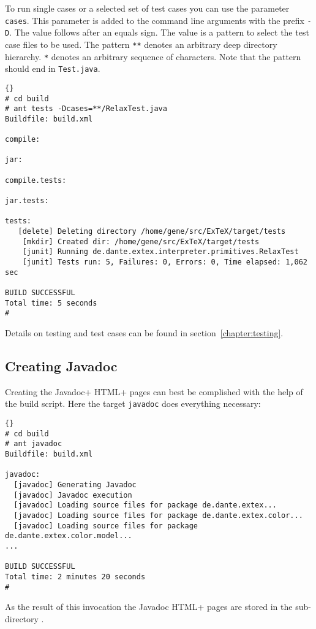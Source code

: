 To run single cases or a selected set of test cases you can use the
parameter \texttt{cases}. This parameter is added to the command line
arguments with the prefix \verb|-D|. The value follows after an equals
sign. The value is a pattern to select the test case files to be used.
The pattern \verb|**| denotes an arbitrary deep directory hierarchy.
\verb|*| denotes an arbitrary sequence of characters. Note that the
pattern should end in \verb|Test.java|.

\begin{lstlisting}{}
# cd build
# ant tests -Dcases=**/RelaxTest.java
Buildfile: build.xml

compile:

jar:

compile.tests:

jar.tests:

tests:
   [delete] Deleting directory /home/gene/src/ExTeX/target/tests
    [mkdir] Created dir: /home/gene/src/ExTeX/target/tests
    [junit] Running de.dante.extex.interpreter.primitives.RelaxTest
    [junit] Tests run: 5, Failures: 0, Errors: 0, Time elapsed: 1,062 sec

BUILD SUCCESSFUL
Total time: 5 seconds
#
\end{lstlisting}

Details on testing and test cases can be found in
section~\ref{chapter:testing}.

\subsection{Creating Javadoc}\label{sec:shell-javadoc}

Creating the \+Javadoc+ \+HTML+ pages can best be complished with the
help of the build script. Here the target \texttt{javadoc} does
everything necessary:

\begin{lstlisting}{}
# cd build
# ant javadoc
Buildfile: build.xml

javadoc:
  [javadoc] Generating Javadoc
  [javadoc] Javadoc execution
  [javadoc] Loading source files for package de.dante.extex...
  [javadoc] Loading source files for package de.dante.extex.color...
  [javadoc] Loading source files for package de.dante.extex.color.model...
...

BUILD SUCCESSFUL
Total time: 2 minutes 20 seconds
#
\end{lstlisting}{}

As the result of this invocation the Javadoc \+HTML+ pages are stored in
the sub-directory .


